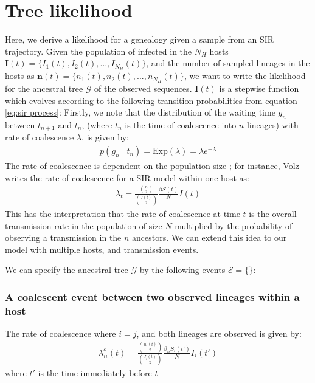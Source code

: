 \documentclass[]{report}
\begin{document}
\section{Tree likelihood}
Here, we derive a likelihood for a genealogy given a sample from an SIR trajectory. Given the population of infected in the $N_H$ hosts $\mathbf{I}(t) = \{I_1(t), I_2(t),...,I_{N_H}(t)\}$,  and the number of sampled lineages in the hosts as $\mathbf{n}(t)=\{n_1(t), n_2(t), ... , n_{N_H}(t)\}$, we want to write the likelihood for the ancestral tree $\mathcal{G}$ of the observed sequences.  $\mathbf{I}(t)$ is a stepwise function which evolves according to the following transition probabilities from equation \ref{eq:sir process}:
Firstly, we note that the distribution of the waiting time $g_n$ between $t_{n+1}$ and $t_n$, (where $t_n$ is the time of coalescence into $n$ lineages) with rate of coalescence $\lambda$, is given by:
\begin{eqnarray}
p(g_n\mid t_n) = \textrm{Exp}(\lambda) = \lambda e^{-\lambda} 
\end{eqnarray}
The rate of coalescence is dependent on the population size ;  for instance, Volz \cite{Volz2009} writes the rate of coalescence for a SIR model within one host as:
\begin{eqnarray}
\lambda_t = \frac{{n \choose 2}}{{I(t) \choose 2}}  \frac{\beta S(t)}{N}I(t)
\end{eqnarray}
This has the interpretation that the rate of coalescence at time $t$ is the overall transmission rate in the population of size $N$ multiplied by the probability of observing a transmission in the $n$ ancestors. We can extend this idea to our model with multiple hosts, and transmission events.

We can specify the ancestral tree $\mathcal{G}$ by the following events $\mathcal{E}=\{\}$: 
\subsubsection{A coalescent event between two observed lineages within a host}
The rate of coalescence where $i=j$, and both lineages are observed is given by:
\begin{eqnarray}
\lambda_{ii}^o(t) =  \frac{{n_i(t) \choose 2}}{{I_i(t) \choose 2}}  \frac{\beta_{ii} S_i(t')}{N}I_i(t')
\end{eqnarray}
where $t'$ is the time immediately before $t$
\end{document}
